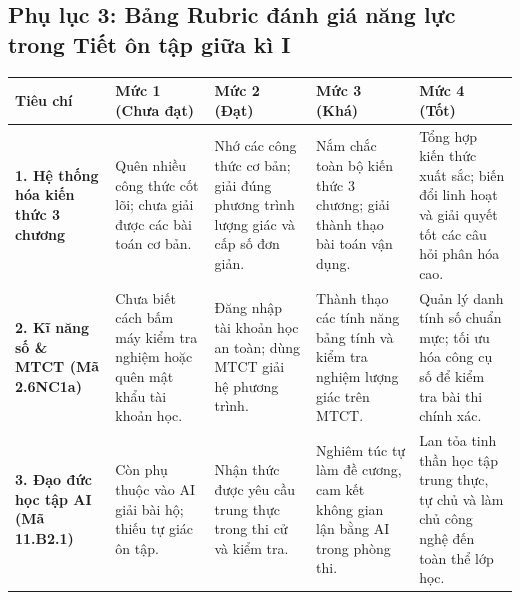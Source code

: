 \documentclass[12pt, a4paper]{article}
\begin{document}
\subsection*{Phụ lục 3: Bảng Rubric đánh giá năng lực trong Tiết ôn tập giữa kì I}

\begin{center}
\begin{tabularx}{\linewidth}{|p{3.2cm}|X|X|X|X|}
\hline
\textbf{Tiêu chí} & \textbf{Mức 1 (Chưa đạt)} & \textbf{Mức 2 (Đạt)} & \textbf{Mức 3 (Khá)} & \textbf{Mức 4 (Tốt)} \\
\hline
\textbf{1. Hệ thống hóa kiến thức 3 chương} & Quên nhiều công thức cốt lõi; chưa giải được các bài toán cơ bản. & Nhớ các công thức cơ bản; giải đúng phương trình lượng giác và cấp số đơn giản. & Nắm chắc toàn bộ kiến thức 3 chương; giải thành thạo bài toán vận dụng. & Tổng hợp kiến thức xuất sắc; biến đổi linh hoạt và giải quyết tốt các câu hỏi phân hóa cao. \\
\hline
\textbf{2. Kĩ năng số \& MTCT (Mã 2.6NC1a)} & Chưa biết cách bấm máy kiểm tra nghiệm hoặc quên mật khẩu tài khoản học. & Đăng nhập tài khoản học an toàn; dùng MTCT giải hệ phương trình. & Thành thạo các tính năng bảng tính và kiểm tra nghiệm lượng giác trên MTCT. & Quản lý danh tính số chuẩn mực; tối ưu hóa công cụ số để kiểm tra bài thi chính xác. \\
\hline
\textbf{3. Đạo đức học tập AI (Mã 11.B2.1)} & Còn phụ thuộc vào AI giải bài hộ; thiếu tự giác ôn tập. & Nhận thức được yêu cầu trung thực trong thi cử và kiểm tra. & Nghiêm túc tự làm đề cương, cam kết không gian lận bằng AI trong phòng thi. & Lan tỏa tinh thần học tập trung thực, tự chủ và làm chủ công nghệ đến toàn thể lớp học. \\
\hline
\end{tabularx}
\end{center}
\end{document}
